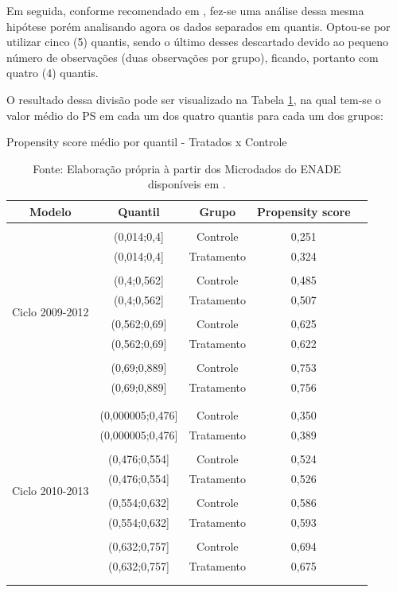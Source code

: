 Em seguida, conforme recomendado em , fez-se uma análise dessa mesma hipótese porém analisando agora os dados separados em quantis. Optou-se por utilizar cinco (5) quantis, sendo o último desses descartado devido ao pequeno número de observações (duas observações por grupo), ficando, portanto com quatro (4) quantis.

O resultado dessa divisão pode ser visualizado na Tabela \ref{tab:psm_quantil}, na qual tem-se o valor médio do PS em cada um dos quatro quantis para cada um dos grupos:

\begin{table}[H] \centering 
	\caption{Propensity score médio por quantil - Tratados x Controle} 
	\label{tab:psm_quantil} 
	\begin{tabular}{ccccc}
		\hline \hline Modelo & Quantil & Grupo & Propensity score  \\ \hline \\ \multirow{11}{*}{Ciclo 2009-2012} &  (0,014;0,4] & Controle & 0,251 \\ & (0,014;0,4] & Tratamento & 0,324 \\ \\ & (0,4;0,562] & Controle & 0,485 \\ & (0,4;0,562] & Tratamento & 0,507 \\ \\ & (0,562;0,69] & Controle & 0,625 \\ & (0,562;0,69] & Tratamento & 0,622 \\ \\ & (0,69;0,889] & Controle & 0,753 \\ & (0,69;0,889] & Tratamento & 0,756
		\\ \\ \hline \hline \\  \multirow{11}{*}{Ciclo 2010-2013} &  (0,000005;0,476] & Controle & 0,350 \\  & (0,000005;0,476] & Tratamento & 0,389 \\ \\ & (0,476;0,554] & Controle & 0,524  \\ & (0,476;0,554] & Tratamento & 0,526 \\ \\ & (0,554;0,632] & Controle & 0,586  \\ & (0,554;0,632] & Tratamento & 0,593 \\ \\ & (0,632;0,757] & Controle & 0,694  \\ & (0,632;0,757] & Tratamento & 0,675 \\ \\ \hline  \\
		\end{tabular}
		\caption*{\RaggedRight Fonte: Elaboração própria à partir dos Microdados do ENADE disponíveis em \cite{INEP2020}.}
	\end{table}

